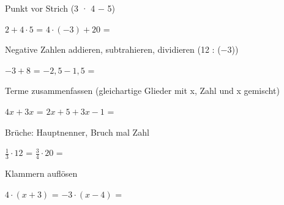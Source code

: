 \setcounter{aufgabe}{0}

\begin{aufgabe}{Punkt vor Strich (3 · 4 − 5)}
\begin{teile}
\teil $2 + 4 \cdot 5$ = \leerfeld
\teil $4 \cdot (-3) + 20$ = \leerfeld
\end{teile}
\end{aufgabe}

\begin{aufgabe}{Negative Zahlen addieren, subtrahieren, dividieren (12 : (−3))}
\begin{teile}
\teil $-3 + 8$ = \leerfeld
\teil $-2{,}5 - 1{,}5$ = \leerfeld
\end{teile}
\end{aufgabe}

\begin{aufgabe}{Terme zusammenfassen (gleichartige Glieder mit x, Zahl und x gemischt)}
\begin{teile}
\teil $4x + 3x$ = \leerfeld
\teil $2x + 5 + 3x - 1$ = \leerfeld
\end{teile}
\end{aufgabe}

\begin{aufgabe}{Brüche: Hauptnenner, Bruch mal Zahl}
\begin{teile}
\teil $\frac{1}{3} \cdot 12$ = \leerfeld
\teil $\frac{3}{4} \cdot 20$ = \leerfeld
\end{teile}
\end{aufgabe}

\begin{aufgabe}{Klammern auflösen}
\begin{teile}
\teil $4 \cdot (x + 3)$ = \leerfeld
\teil $-3 \cdot (x - 4)$ = \leerfeld
\end{teile}
\end{aufgabe}


